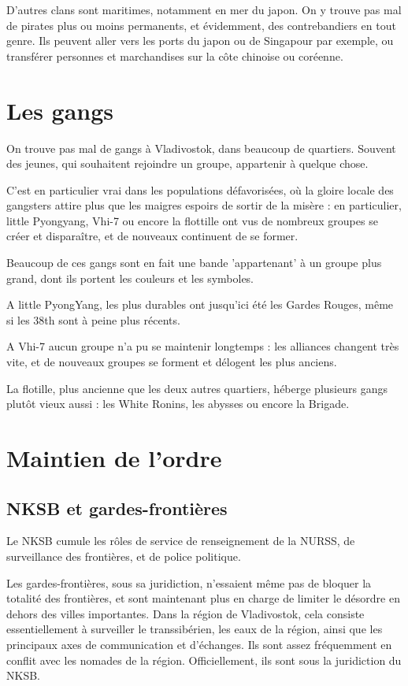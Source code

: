 \documentclass[10pt,a4paper]{book}
\begin{document}
D'autres clans sont maritimes, notamment en mer du japon. On y trouve pas mal de pirates plus ou moins permanents, et évidemment, des contrebandiers en tout genre. Ils peuvent aller vers les ports du japon ou de Singapour par exemple, ou transférer personnes et marchandises sur la côte chinoise ou coréenne.
\section{Les gangs}
On trouve pas mal de gangs à Vladivostok, dans beaucoup de quartiers. Souvent des jeunes, qui souhaitent rejoindre un groupe, appartenir à quelque chose.

C'est en particulier vrai dans les populations défavorisées, où la gloire locale des gangsters attire plus que les maigres espoirs de sortir de la misère : en particulier, little Pyongyang, Vhi-7 ou encore la flottille ont vus de nombreux groupes se créer et disparaître, et de nouveaux continuent de se former.

Beaucoup de ces gangs sont en fait une bande 'appartenant' à un groupe plus grand, dont ils portent les couleurs et les symboles.

A little PyongYang, les plus durables ont jusqu'ici été les Gardes Rouges, même si les 38th sont à peine plus récents.

A Vhi-7 aucun groupe n'a pu se maintenir longtemps : les alliances changent très vite, et de nouveaux groupes se forment et délogent les plus anciens.

La flotille, plus ancienne que les deux autres quartiers, héberge plusieurs gangs plutôt vieux aussi : les White Ronins, les abysses ou encore la Brigade. 
\section{Maintien de l'ordre}
\subsection{NKSB et gardes-frontières}
Le NKSB cumule les rôles de service de renseignement de la NURSS, de surveillance des frontières, et de police politique.

Les gardes-frontières, sous sa juridiction, n'essaient même pas de bloquer la totalité des frontières, et sont maintenant plus en charge de limiter le désordre en dehors des villes importantes. Dans la région de Vladivostok, cela consiste essentiellement à surveiller le transsibérien, les eaux de la région, ainsi que les principaux axes de communication et d'échanges. Ils sont assez fréquemment en conflit avec les nomades de la région. Officiellement, ils sont sous la juridiction du NKSB.
\end{document}
